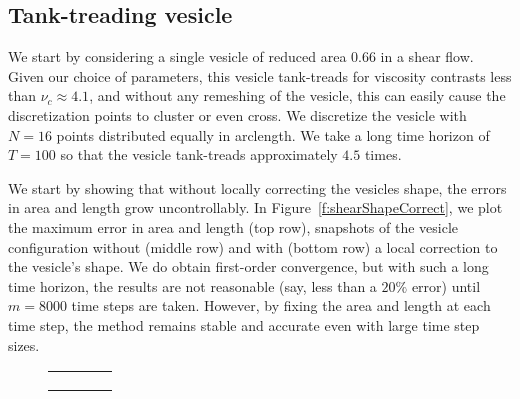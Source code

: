 \subsection{Tank-treading vesicle}
We start by considering a single vesicle of reduced area $0.66$ in a
shear flow.  Given our choice of parameters, this vesicle tank-treads
for viscosity contrasts less than $\nu_{c} \approx 4.1$, and without any
remeshing of the vesicle, this can easily cause the discretization
points to cluster or even cross.  We discretize the vesicle with $N=16$
points distributed equally in arclength.  We take a long time horizon of
$T=100$ so that the vesicle tank-treads approximately $4.5$ times.

We start by showing that without locally correcting the vesicles shape,
the errors in area and length grow uncontrollably.  In
Figure~\ref{f:shearShapeCorrect}, we plot the maximum error in area and
length (top row), snapshots of the vesicle configuration without (middle
row) and with (bottom row) a local correction to the vesicle's shape.
We do obtain first-order convergence, but with such a long time horizon,
the results are not reasonable (say, less than a $20\%$ error) until
$m=8000$ time steps are taken.    However, by fixing the area and length at each time step,
the method remains stable and accurate even with large time step sizes.

\begin{figure}[htpb]
  \centering
  \begin{tabular}{cccc}
     &
     &
     &
     \\
     &
     &
     &
     \\
     &
     &
     &
    
  \end{tabular}
\end{figure}

